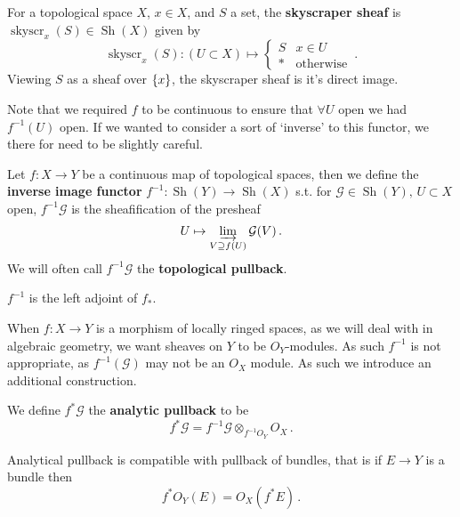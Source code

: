 \documentclass{article}
\begin{document}
\begin{example}
	For a topological space $X$, $x \in X$, and $S$ a set, the \textbf{skyscraper sheaf} is $\operatorname{skyscr}_x(S) \in \operatorname{Sh}(X)$ given by 
	\[
	\operatorname{skyscr}_x(S): (U \subset X) \mapsto \left \lbrace \begin{array}{cc}
	S & x \in U \\ \ast & \text{otherwise}
	\end{array} \right. \, .
	\]
	Viewing $S$ as a sheaf over $\left\{ x \right\}$, the skyscraper sheaf is it's direct image.  
\end{example}

\begin{remark}
	Note that we required $f$ to be continuous to ensure that $\forall U$ open we had $f^{-1}(U)$ open. If we wanted to consider a sort of `inverse' to this functor, we there for need to be slightly careful. 
\end{remark}

\begin{definition}
	Let $f:X\to Y$ be a continuous map of topological spaces, then we define the \textbf{inverse image functor} $f^{-1} : \operatorname{Sh}(Y) \to \operatorname{Sh}(X)$ s.t. for $\mathcal{G} \in \operatorname{Sh}(Y), \, U \subset X$ open, $f^{-1}\mathcal{G}$ is the sheafification of the presheaf 
	\[
	U \mapsto \varinjlim_{V \supseteq f(U)} \mathcal{G}(V) \, .
	\]
	We will often call $f^{-1}\mathcal{G}$ the \textbf{topological pullback}.
\end{definition}

\begin{prop}
	$f^{-1}$ is the left adjoint of $f_\ast$. 
\end{prop}

When $f:X \to Y$ is a morphism of locally ringed spaces, as we will deal with in algebraic geometry, we want sheaves on $Y$ to be $O_Y$-modules. As such $f^{-1}$ is not appropriate, as $f^{-1}(\mathcal{G})$ may not be an $O_X$ module. As such we introduce an additional construction.

\begin{definition}
	We define $f^\ast \mathcal{G}$ the \textbf{analytic pullback} to be  
	\[
	f^\ast \mathcal{G} = f^{-1} \mathcal{G} \otimes_{f^{-1} O_Y} O_X \, .
	\]
\end{definition}

\begin{lemma}
	Analytical pullback is compatible with pullback of bundles, that is if $E\to Y$ is a bundle then 
	\[
	f^\ast O_Y(E) = O_X(f^\ast E) \, .
	\]
\end{lemma}
\end{document}
